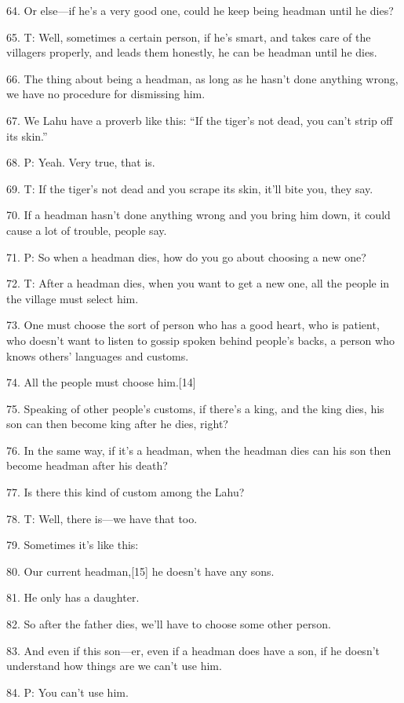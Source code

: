 {64. Or else---if he's a very good one, could he keep being headman until
he dies?}

{65. T: Well, sometimes a certain person, if he's smart, and takes care
of the villagers properly, and leads them honestly, he can be headman until he
dies.}

{66. The thing about being a headman, as long as he hasn't done anything
wrong, we have no procedure for dismissing him.}

{67. We Lahu have a proverb like this: ``If the tiger's not dead, you can't
strip off its skin.''}

{68. P: Yeah. Very true, that is.}

{69. T: If the tiger's not dead and you scrape its skin, it'll bite you,
they say.}

{70. If a headman hasn't done anything wrong and you bring him down, it
could cause a lot of trouble, people say.}

{71. P: So when a headman dies, how do you go about choosing a new one?}

{72. T: After a headman dies, when you want to get a new one, all the people
in the village must select him.}

{73. One must choose the sort of person who has a good heart, who is patient,
who doesn't want to listen to gossip spoken behind people's backs, a person who
knows others' languages and customs.}

{74. All the people must choose him.[14]}

{75. Speaking of other people's customs, if there's a king, and the king
dies, his son can then become king after he dies, right?}

{76. In the same way, if it's a headman, when the headman dies can his son
then become headman after his death?}

{77. Is there this kind of custom among the Lahu?}

{78. T: Well, there is---we have that too.}

{79. Sometimes it's like this:}

{80. Our current headman,[15] he doesn't have any sons.}

{81. He only has a daughter.}

{82. So after the father dies, we'll have to choose some other person.}

{83. And even if this son---er, even if a headman does have a son, if he
doesn't understand how things are we can't use him.}

{84. P: You can't use him.}

